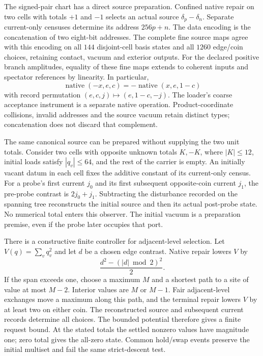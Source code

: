The signed-pair chart has a direct source preparation. Confined native
repair on two cells with totals $+1$ and $-1$ selects an actual source
$\delta_p-\delta_n$. Separate current-only censuses determine its
address $256p+n$. The data encoding is the concatenation of two
eight-bit addresses. The complete fine source maps agree with this
encoding on all $144$ disjoint-cell basis states and all $1260$
edge/coin choices, retaining contact, vacuum and exterior outputs.
For the declared positive branch amplitudes, equality of these fine
maps extends to coherent inputs and spectator references by linearity.
In particular,
\[
 \operatorname{native}(-x,e,c)
 =-\operatorname{native}(x,e,1-c)
\]
with record permutation $(e,c,j)\mapsto(e,1-c,-j)$.
The loader's coarse acceptance instrument is a separate native
operation. Product-coordinate collisions, invalid addresses and the
source vacuum retain distinct types; concatenation does not discard
that complement.

The same canonical source can be prepared without supplying the two unit
totals. Consider two cells with opposite unknown totals $K,-K$, where
$|K|\leq12$, initial loads satisfy $|q_v|\leq64$, and the rest of the
carrier is empty. An initially vacant datum in each cell fixes the
additive constant of its current-only census. For a probe's first current
$j_0$ and its first subsequent opposite-coin current $j_1$, the
pre-probe contrast is $2j_0+j_1$. Subtracting the disturbance
recorded on the spanning tree reconstructs the initial source and then
its actual post-probe state. No numerical total enters this observer.
The initial vacuum is a preparation premise, even if the probe later
occupies that port.

There is a constructive finite controller for adjacent-level selection.
Let $V(q)=\sum_vq_v^2$ and let $d$ be a chosen edge contrast. Native
repair lowers $V$ by
\[
 \frac{d^2-(|d|\bmod2)^2}{2}.
\]
If the span exceeds one, choose a maximum $M$ and a shortest path to
a site of value at most $M-2$. Interior values are $M$ or $M-1$.
Fair adjacent-level exchanges move a maximum along this path, and
the terminal repair lowers $V$ by at least two on either coin.
The reconstructed source and subsequent current records determine all
choices. The bounded potential therefore gives a finite request bound.
At the stated totals the settled nonzero values have magnitude one;
zero total gives the all-zero state. Common hold/swap events preserve
the initial multiset and fail the same strict-descent test.

